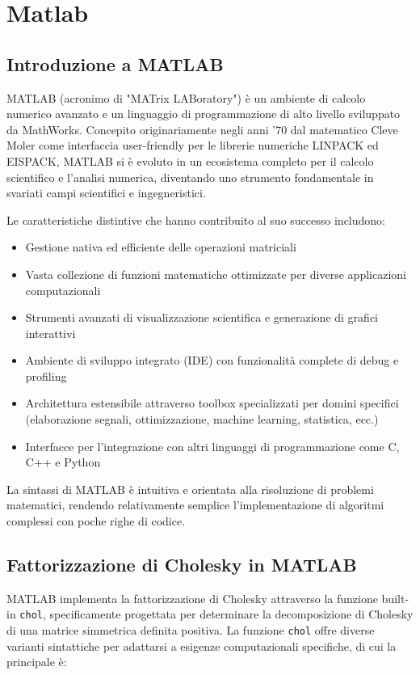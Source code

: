 
\chapter{Matlab}

\section{Introduzione a MATLAB}

MATLAB (acronimo di "MATrix LABoratory") è un ambiente di calcolo numerico avanzato e un linguaggio di programmazione 
di alto livello sviluppato da MathWorks. Concepito originariamente negli anni '70 dal matematico Cleve Moler come interfaccia 
user-friendly per le librerie numeriche LINPACK ed EISPACK, MATLAB si è evoluto in un ecosistema completo per il calcolo 
scientifico e l'analisi numerica, diventando uno strumento fondamentale in svariati campi scientifici e ingegneristici.

Le caratteristiche distintive che hanno contribuito al suo successo includono:

\begin{itemize}
    \item Gestione nativa ed efficiente delle operazioni matriciali
    \item Vasta collezione di funzioni matematiche ottimizzate per diverse applicazioni computazionali
    \item Strumenti avanzati di visualizzazione scientifica e generazione di grafici interattivi
    \item Ambiente di sviluppo integrato (IDE) con funzionalità complete di debug e profiling
    \item Architettura estensibile attraverso toolbox specializzati per domini specifici (elaborazione segnali, ottimizzazione, machine learning, statistica, ecc.)
    \item Interfacce per l'integrazione con altri linguaggi di programmazione come C, C++ e Python
\end{itemize}

La sintassi di MATLAB è intuitiva e orientata alla risoluzione di problemi matematici, 
rendendo relativamente semplice l'implementazione di algoritmi complessi con poche righe di codice.

\section{Fattorizzazione di Cholesky in MATLAB}

MATLAB implementa la fattorizzazione di Cholesky attraverso la funzione built-in \texttt{chol}, 
specificamente progettata per determinare la decomposizione di Cholesky di una matrice simmetrica definita positiva.
La funzione \texttt{chol} offre diverse varianti sintattiche per adattarsi a esigenze computazionali specifiche, 
di cui la principale è:

